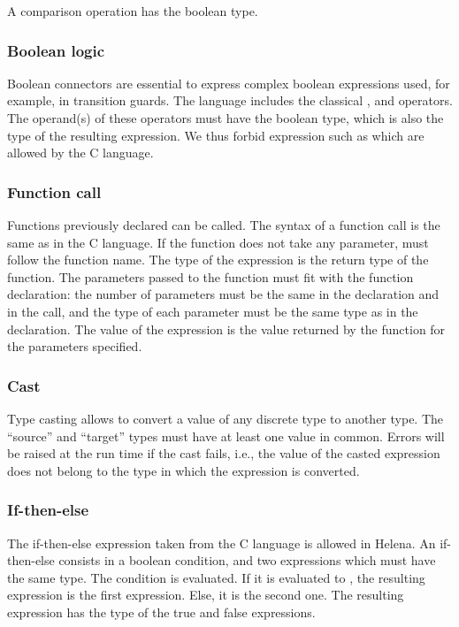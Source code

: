 A comparison operation has the boolean type.\\

\comparisonoperationdef


\subsubsection{Boolean logic}
Boolean connectors are essential to express complex boolean
expressions used, for example, in transition guards.  The language
includes the classical ,  and  operators.  The
operand(s) of these operators must have the boolean type, which is
also the type of the resulting expression.  We thus forbid expression
such as  which are allowed by the C language.\\

\booleanoperationdef


\subsubsection{Function call}
Functions previously declared can be called.  The syntax of a function
call is the same as in the C language.  If the function does not take
any parameter, \LS{()} must follow the function name.  The type of the
expression is the return type of the function.  The parameters passed
to the function must fit with the function declaration: the number of
parameters must be the same in the declaration and in the call, and
the type of each parameter must be the same type as in the
declaration.  The value of the expression is the value returned by the
function for the parameters specified.\\

\functioncalldef


\subsubsection{Cast}
Type casting allows to convert a value of any discrete type to another
type.  The ``source'' and ``target'' types must have at least one
value in common.  Errors will be raised at the run time if the cast
fails, i.e., the value of the casted expression does not belong to the
type in which the expression is converted.\\

\castdef


\subsubsection{If-then-else}
The if-then-else expression taken from the C language is allowed in
Helena.  An if-then-else consists in a boolean condition, and two
expressions which must have the same type.  The condition is
evaluated.  If it is evaluated to , the resulting expression
is the first expression.  Else, it is the second one.  The resulting
expression has the type of the true and false expressions.\\

